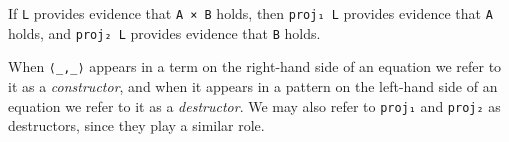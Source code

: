 \begin{fence}
\begin{code}%
\>[0]\AgdaSpace{}%
\AgdaSymbol{:}\AgdaSpace{}%
\AgdaSpace{}%
\AgdaSymbol{\{}\AgdaSpace{}%
\AgdaSpace{}%
\AgdaSymbol{:}\AgdaSpace{}%
\AgdaSymbol{\}}\<%
\\
\>[0][@{}l@{\AgdaIndent{0}}]%
\>[2]%
\>[44I]\AgdaSpace{}%
\AgdaSpace{}%
\<%
\\
\>[.][@{}l@{}]\<[44I]%
\>[4]\AgdaComment{-----}\<%
\\
%
\>[2]\AgdaSpace{}%
\<%
\\
\>[0]\AgdaSpace{}%
\AgdaSpace{}%
\AgdaSpace{}%
\AgdaOperator{\AgdaInductiveConstructor{,}}\AgdaSpace{}%
\AgdaSpace{}%
\AgdaSpace{}%
\AgdaSymbol{=}\AgdaSpace{}%
\<%
\\
%
\\[\AgdaEmptyExtraSkip]%
\>[0]\AgdaSpace{}%
\AgdaSymbol{:}\AgdaSpace{}%
\AgdaSpace{}%
\AgdaSymbol{\{}\AgdaSpace{}%
\AgdaSpace{}%
\AgdaSymbol{:}\AgdaSpace{}%
\AgdaSymbol{\}}\<%
\\
\>[0][@{}l@{\AgdaIndent{0}}]%
\>[2]%
\>[61I]\AgdaSpace{}%
\AgdaSpace{}%
\<%
\\
\>[.][@{}l@{}]\<[61I]%
\>[4]\AgdaComment{-----}\<%
\\
%
\>[2]\AgdaSpace{}%
\<%
\\
\>[0]\AgdaSpace{}%
\AgdaSpace{}%
\AgdaSpace{}%
\AgdaOperator{\AgdaInductiveConstructor{,}}\AgdaSpace{}%
\AgdaSpace{}%
\AgdaSpace{}%
\AgdaSymbol{=}\AgdaSpace{}%
\<%
\end{code}
\end{fence}

If \texttt{L} provides evidence that \texttt{A\ ×\ B} holds, then
\texttt{proj₁\ L} provides evidence that \texttt{A} holds, and
\texttt{proj₂\ L} provides evidence that \texttt{B} holds.

When \texttt{⟨\_,\_⟩} appears in a term on the right-hand side of an
equation we refer to it as a \emph{constructor}, and when it appears in
a pattern on the left-hand side of an equation we refer to it as a
\emph{destructor}. We may also refer to \texttt{proj₁} and
\texttt{proj₂} as destructors, since they play a similar role.

